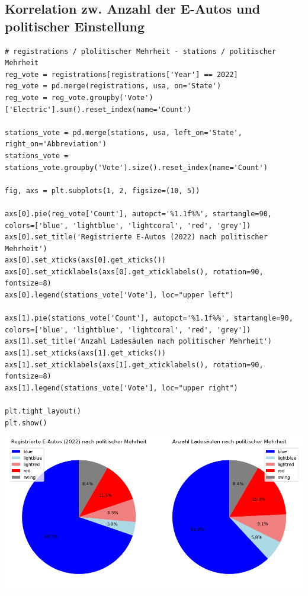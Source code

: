 \subsection{Korrelation zw. Anzahl der E-Autos und politischer Einstellung}

\begin{verbatim}
# registrations / plolitischer Mehrheit - stations / politischer Mehrheit 
reg_vote = registrations[registrations['Year'] == 2022]
reg_vote = pd.merge(registrations, usa, on='State')
reg_vote = reg_vote.groupby('Vote')['Electric'].sum().reset_index(name='Count')

stations_vote = pd.merge(stations, usa, left_on='State', right_on='Abbreviation')
stations_vote = stations_vote.groupby('Vote').size().reset_index(name='Count')

fig, axs = plt.subplots(1, 2, figsize=(10, 5))

axs[0].pie(reg_vote['Count'], autopct='%1.1f%%', startangle=90, colors=['blue', 'lightblue', 'lightcoral', 'red', 'grey'])
axs[0].set_title('Registrierte E-Autos (2022) nach politischer Mehrheit')
axs[0].set_xticks(axs[0].get_xticks())
axs[0].set_xticklabels(axs[0].get_xticklabels(), rotation=90, fontsize=8)
axs[0].legend(stations_vote['Vote'], loc="upper left")

axs[1].pie(stations_vote['Count'], autopct='%1.1f%%', startangle=90, colors=['blue', 'lightblue', 'lightcoral', 'red', 'grey'])
axs[1].set_title('Anzahl Ladesäulen nach politischer Mehrheit')
axs[1].set_xticks(axs[1].get_xticks())
axs[1].set_xticklabels(axs[1].get_xticklabels(), rotation=90, fontsize=8)
axs[1].legend(stations_vote['Vote'], loc="upper right")

plt.tight_layout()
plt.show()
\end{verbatim}

\begin{center}
\includegraphics[scale=0.5]{img/output_8_0.png}
\end{center}

